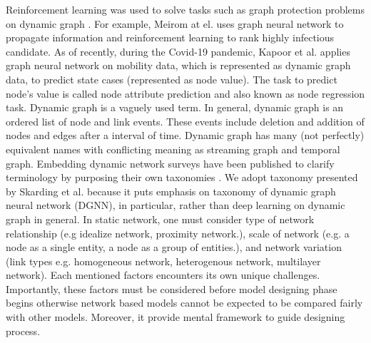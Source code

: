 \documentclass{IEEEtran}
\begin{document}
Reinforcement learning was used to solve tasks such as graph protection problems on dynamic graph \cite{wijayanto2018learning,wijayanto2019effective}. For example, Meirom at el. \cite{meirom2021controlling} uses graph neural network to propagate information and reinforcement learning to rank highly infectious candidate. As of recently, during the Covid-19 pandemic, Kapoor et al. \cite{kapoor2020examining}  applies graph neural network on mobility data, which is represented as dynamic graph data, to predict state cases (represented as node value). The task to predict node's value is called node attribute prediction and also known as node regression task.
Dynamic graph is a vaguely used term. In general, dynamic graph is an ordered list of node and link events. These events include deletion and addition of nodes and edges after a interval of time. Dynamic graph has many (not perfectly) equivalent names with conflicting meaning as streaming graph and temporal graph. Embedding dynamic network surveys have been published to clarify terminology by purposing their own taxonomies \cite{barrosSurveyEmbeddingDynamic2021,kazemiRepresentationLearningDynamica,skardingFoundationsModelingDynamic2021}. We adopt taxonomy presented by Skarding et al. \cite{skardingFoundationsModelingDynamic2021} because it puts emphasis on taxonomy of dynamic graph neural network (DGNN), in particular, rather than deep learning on dynamic graph in general.
In static network, one must consider type of network relationship (e.g idealize network, proximity network.), scale of network (e.g. a node as a single entity, a node as a group of entities.), and network variation (link types e.g. homogeneous network, heterogenous network, multilayer network). Each mentioned factors encounters its own unique challenges. Importantly, these factors must be considered before model designing phase begins otherwise network based models cannot be expected to be compared fairly with other models. Moreover, it provide mental framework to guide designing process.
\end{document}
